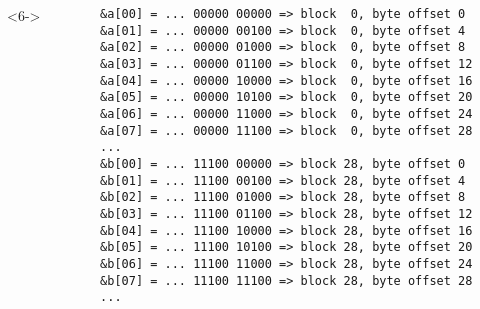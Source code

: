 \documentclass[dvipsnames,presentation,aspectratio=169,14pt]{beamer}
\begin{document}
\begin{frame}[fragile]
\begin{columns}
\begin{column}{0.33\linewidth}
      \begin{onlyenv}<6->
      \end{onlyenv}%
    \end{column}
    \begin{column}{0.45\linewidth}
\begin{verbatim}
&a[00] = ... 00000 00000 => block  0, byte offset 0
&a[01] = ... 00000 00100 => block  0, byte offset 4
&a[02] = ... 00000 01000 => block  0, byte offset 8
&a[03] = ... 00000 01100 => block  0, byte offset 12
&a[04] = ... 00000 10000 => block  0, byte offset 16
&a[05] = ... 00000 10100 => block  0, byte offset 20
&a[06] = ... 00000 11000 => block  0, byte offset 24
&a[07] = ... 00000 11100 => block  0, byte offset 28
...
&b[00] = ... 11100 00000 => block 28, byte offset 0
&b[01] = ... 11100 00100 => block 28, byte offset 4
&b[02] = ... 11100 01000 => block 28, byte offset 8
&b[03] = ... 11100 01100 => block 28, byte offset 12
&b[04] = ... 11100 10000 => block 28, byte offset 16
&b[05] = ... 11100 10100 => block 28, byte offset 20
&b[06] = ... 11100 11000 => block 28, byte offset 24
&b[07] = ... 11100 11100 => block 28, byte offset 28
...
\end{verbatim}
    \end{column}
  \end{columns}
\end{frame}
\end{document}

